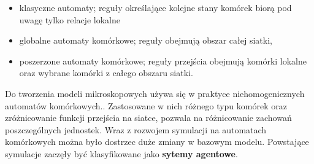 \begin{itemize}
\item klasyczne automaty; reguły określające kolejne stany komórek biorą pod uwagę tylko relacje lokalne
\item globalne automaty komórkowe; reguły obejmują obszar całej siatki,
\item poszerzone automaty komórkowe; reguły przejścia obejmują komórki lokalne oraz wybrane komórki z całego obszaru siatki.
\end{itemize}

Do tworzenia modeli mikroskopowych używa się w praktyce niehomogenicznych automatów komórkowych.\cite{modelowanieDynamikiTlumu}. Zastosowane w nich różnego typu komórek oraz zróżnicowanie funkcji przejścia na siatce, pozwala na różnicowanie zachowań poszczególnych jednostek. Wraz z rozwojem symulacji na automatach komórkowych można było dostrzec duże zmiany w bazowym modelu. Powstające symulacje zaczęły być klasyfikowane jako \textbf{sytemy agentowe}.




















